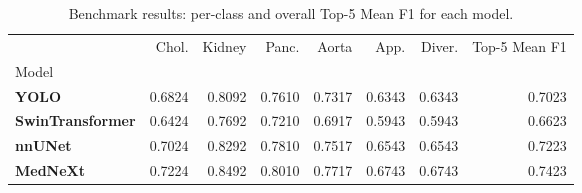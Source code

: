 \begin{table}
\caption{Benchmark results: per-class and overall Top-5 Mean F1 for each model.}
\label{tab:benchmark}
\begin{tabular}{lrrrrrrr}
\toprule
 & Chol. & Kidney & Panc. & Aorta & App. & Diver. & Top-5 Mean F1 \\
Model &  &  &  &  &  &  &  \\
\midrule
\textbf{YOLO} & 0.6824 & 0.8092 & 0.7610 & 0.7317 & 0.6343 & 0.6343 & 0.7023 \\
\textbf{SwinTransformer} & 0.6424 & 0.7692 & 0.7210 & 0.6917 & 0.5943 & 0.5943 & 0.6623 \\
\textbf{nnUNet} & 0.7024 & 0.8292 & 0.7810 & 0.7517 & 0.6543 & 0.6543 & 0.7223 \\
\textbf{MedNeXt} & 0.7224 & 0.8492 & 0.8010 & 0.7717 & 0.6743 & 0.6743 & 0.7423 \\
\bottomrule
\end{tabular}
\end{table}
